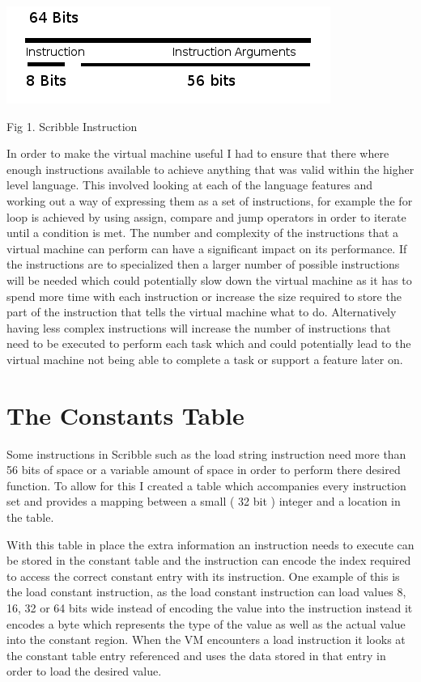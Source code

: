 \documentclass[]{final_report}
\begin{document}
\includegraphics{"Instruction"}

Fig 1. Scribble Instruction

In order to make the virtual machine useful I had to ensure that there where enough instructions available to achieve anything that was valid within the higher level language. This involved looking at each of the language features and working out a way of expressing them as a set of instructions, for example the for loop is achieved by using assign, compare and jump operators in order to iterate until a condition is met. The number and complexity of the instructions that a virtual machine can perform can have a significant impact on its performance. If the instructions are to specialized then a larger number of possible instructions will be needed which could potentially slow down the virtual machine as it has to spend more time with each instruction or increase the size required to store the part of the instruction that tells the virtual machine what to do. Alternatively having less complex instructions will increase the number of instructions that need to be executed to perform each task which  and could potentially lead to the virtual machine not being able to complete a task or support a feature later on.

\section{The Constants Table}

Some instructions in Scribble such as the load string instruction need more than 56 bits of space or a variable amount of space in order to perform there desired function. To allow for this I created a table which accompanies every instruction set and provides a mapping between a small ( 32 bit ) integer and a location in the table.

With this table in place the extra information an instruction needs to execute can be stored in the constant table and the instruction can encode the index required to access the correct constant entry with its instruction. One example of this is the load constant instruction, as the load constant instruction can load values 8, 16, 32 or 64 bits wide instead of encoding the value into the instruction instead it encodes a byte which represents the type of the value as well as the actual value into the constant region. When the VM encounters a load instruction it looks at the constant table entry referenced and uses the data stored in that entry in order to load the desired value.
\end{document}
